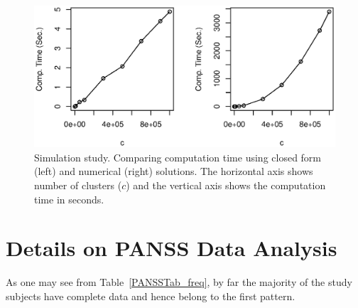 \documentclass[11pt,a5paper,twoside]{book}
\begin{document}
{\addtolength{\tabcolsep}{-.9mm}

\begin{table}[ht]
\centering
\caption[Simulation study. The computation time]{Simulation study. The computation time for a sample with $n=10$ and $c=$1e+02, 1e+03, 1e+04, 5e+04, 1e+05, 3e+05, 5e+05, 7e+05, 9e+05, 1e+06. The closed form solution is obtained by implementing the results of this paper in R, and the numerical solution is obtained using PROC MIXED in SAS to estimate a repeated measurement model with AR(1) covariance structure.}
\label{comp_time}

\vspace*{2mm}
\end{table}


\addtolength{\tabcolsep}{.9mm}


\begin{figure}[t]
\centering
\includegraphics[scale=1, trim= 0cm 4cm 0cm 4cm]{comp_time.eps}
\caption[Simulation study. Comparing computation time using closed form and numerical solutions]{Simulation study. Comparing computation time using closed form (left) and numerical (right) solutions. The horizontal axis shows number of clusters ($c$) and the vertical axis shows the computation time in seconds.} \label{fig_comp_time}
\end{figure}

\section{Details on PANSS Data Analysis}\label{suppdata}
\vspace{-3.5mm}
As one may see from Table~\ref{PANSSTab_freq}, by far the majority of the study subjects have complete data and hence belong to the first pattern.

}
\end{document}

